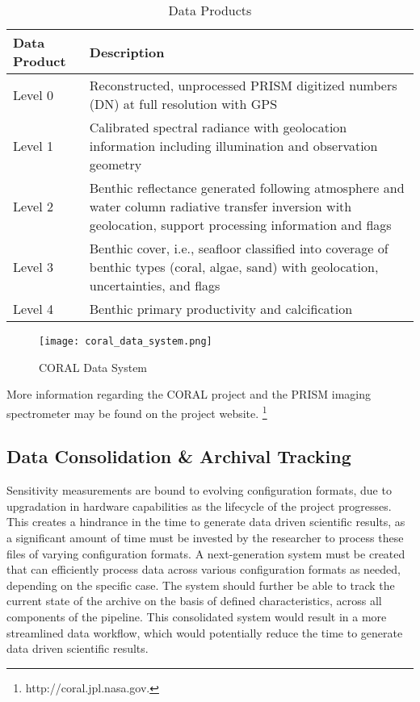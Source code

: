 \documentclass{article}
\begin{document}
\begin{multicols*}{2}
\begin{table}[H]
	\caption{Data Products \cite{coral-data-products}}
	\begin{tabular}{| >{\centering\arraybackslash}m{1in} | >{\centering\arraybackslash}m{2in} |}
		\hline
		Data Product & Description \\
		\hline 
		Level 0 & Reconstructed, unprocessed PRISM digitized numbers (DN) at full resolution with GPS \\
		\hline 
		Level 1 & Calibrated spectral radiance with geolocation information including illumination and observation geometry \\
		\hline 
		Level 2 & Benthic reflectance generated following atmosphere and water column radiative transfer inversion with geolocation, support processing information and flags \\
		\hline 
		Level 3 & Benthic cover, i.e., seafloor classified into coverage of benthic types (coral, algae, sand) with geolocation, uncertainties, and flags \\
		\hline 
		Level 4 & Benthic primary productivity and calcification \\
		\hline 
	\end{tabular}
\end{table}

\begin{figure}[H]
\centering
\texttt{[image: coral\_data\_system.png]}
\caption{CORAL Data System \cite{coral-data-products}}
\end{figure}

More information regarding the CORAL project and the PRISM imaging spectrometer may be found on the project website. \footnote{http://coral.jpl.nasa.gov.}

\subsection{Data Consolidation \& Archival Tracking}
Sensitivity measurements are bound to evolving configuration formats, due to upgradation in hardware capabilities as the lifecycle of the project progresses. This creates a hindrance in the time to generate data driven scientific results, as a significant amount of time must be invested by the researcher to process these files of varying configuration formats. A next-generation system must be created that can efficiently process data across various configuration formats as needed, depending on the specific case. 
The system should further be able to track the current state of the archive on the basis of defined characteristics, across all components of the pipeline. This consolidated system would result in a more streamlined data workflow, which would potentially reduce the time to generate data driven scientific results.


\end{multicols*}
\end{document}
